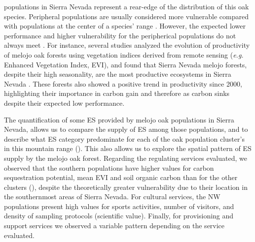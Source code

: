 \Qp populations in Sierra Nevada represent a rear-edge of the distribution of this oak species. Peripheral populations are usually considered more vulnerable compared with populations at the center of a species' range \autocite[\emph{i.e}. center-periphery hypothesis][]{Pirononetal2017GeographicVariation}. However, the expected lower performance and higher vulnerability for the peripherical populations do not always meet \autocite[\emph{e.g.}][]{Abelietal2014EffectsMarginality,Oldfatheretal2020RangeEdges,PerezLuqueetal2020LanduseLegacies}. For instance, several studies analyzed the evolution of productivity of melojo oak forests using vegetation indices derived from remote sensing (\emph{e.g.} Enhanced Vegetation Index, EVI), and found that Sierra Nevada melojo forests, despite their high seasonality, are the most productive ecosystems in Sierra Nevada \autocites{Dionisioetal2012SatelliteBasedMonitoring,AlcarazSeguraetal2016ChangesVegetation,PerezLuqueetal2015OntologicalSystem,Cazorlaetal2020RemoteSensingbased}. These forests also showed a positive trend in productivity since 2000, highlighting their importance in carbon gain and therefore as carbon sinks \autocite{PerezLuqueetal2015OntologicalSystem} despite their expected low performance. 

The quantification of some ES provided by melojo oak populations in Sierra Nevada, allows us to compare the supply of ES among those populations, and to describe what ES category predominate for each of the oak population cluster’s in this mountain range (). This also allows us to explore the spatial pattern of ES supply by the melojo oak forest. Regarding the regulating services evaluated, we observed that the southern populations have higher values for carbon sequestration potential, mean EVI and soil organic carbon than for the other clusters (), despite the theoretically greater vulnerability due to their location in the southernmost areas of Sierra Nevada. For cultural services, the NW populations present high values for sports activities, number of visitors, and density of sampling protocols (scientific value). Finally, for provisioning and support services we observed a variable pattern depending on the service evaluated.

